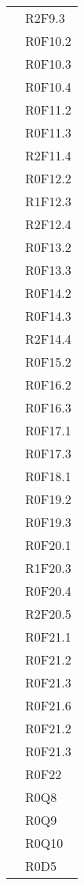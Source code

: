 \begin{center}
\begin{longtable}{ c m{4cm} }
	\rowcolor{white}& R2F9.3\\
	\rowcolor{white}& R0F10.2\\
	\rowcolor{white}& R0F10.3\\
	\rowcolor{white}& R0F10.4\\
	\rowcolor{white}& R0F11.2\\
	\rowcolor{white}& R0F11.3\\
	\rowcolor{white}& R2F11.4\\
	\rowcolor{white}& R0F12.2\\
	\rowcolor{white}& R1F12.3\\
	\rowcolor{white}& R2F12.4\\
	\rowcolor{white}& R0F13.2\\
	\rowcolor{white}& R0F13.3\\
	\rowcolor{white}& R0F14.2\\
	\rowcolor{white}& R0F14.3\\
	\rowcolor{white}& R2F14.4\\
	\rowcolor{white}& R0F15.2\\
	\rowcolor{white}& R0F16.2\\
	\rowcolor{white}& R0F16.3\\
	\rowcolor{white}& R0F17.1\\
	\rowcolor{white}& R0F17.3\\
	\rowcolor{white}& R0F18.1\\
	\rowcolor{white}& R0F19.2\\
	\rowcolor{white}& R0F19.3\\
	\rowcolor{white}& R0F20.1\\
	\rowcolor{white}& R1F20.3\\
	\rowcolor{white}& R0F20.4\\
	\rowcolor{white}& R2F20.5\\
	\rowcolor{white}& R0F21.1\\
	\rowcolor{white}& R0F21.2\\
	\rowcolor{white}& R0F21.3\\
	\rowcolor{white}& R0F21.6\\
	\rowcolor{white}& R0F21.2\\
	\rowcolor{white}& R0F21.3\\
	\rowcolor{white}& R0F22\\
	\rowcolor{white}& R0Q8\\
	\rowcolor{white}& R0Q9\\
	\rowcolor{white}& R0Q10\\
	\rowcolor{white}& R0D5\\

\end{longtable}
\end{center}
